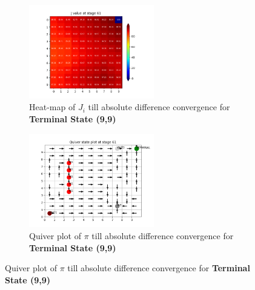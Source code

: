\begin{figure}[h]
\begin{subfigure}
\centering
\includegraphics[angle=0,width=0.6\textwidth]{hw2/logs/t=99_N=-1/J-heatmap-61.png}
\caption{Heat-map of $J_i$ till absolute difference convergence for \textbf{Terminal State (9,9)}}
\end{subfigure}

\begin{subfigure}
\centering
\includegraphics[angle=0,width=0.6\textwidth]{hw2/logs/t=99_N=-1/quiver-61.png}
\caption{Quiver plot of $\pi$  till absolute difference convergence for \textbf{Terminal State (9,9)}}
\end{subfigure}
\end{figure}


